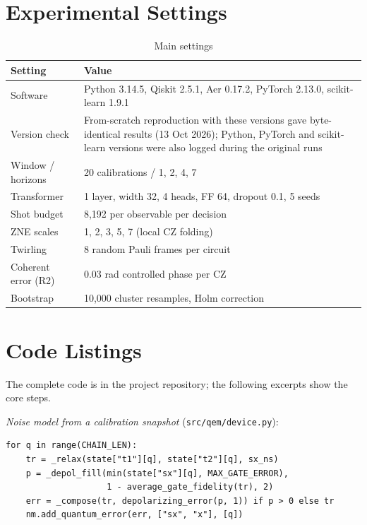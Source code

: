 \documentclass[conference]{IEEEtran}
\begin{document}
\section{Experimental Settings}
\begin{table}[htbp]
\caption{Main settings}
\begin{center}
\begin{tabular}{p{2.3cm}p{5.6cm}}
\toprule
\textbf{Setting} & \textbf{Value} \\
\midrule
Software & Python 3.14.5, Qiskit 2.5.1, Aer 0.17.2, PyTorch 2.13.0, scikit-learn 1.9.1 \\
Version check & From-scratch reproduction with these versions gave byte-identical results (13 Oct 2026); Python, PyTorch and scikit-learn versions were also logged during the original runs \\
Window / horizons & 20 calibrations / 1, 2, 4, 7 \\
Transformer & 1 layer, width 32, 4 heads, FF 64, dropout 0.1, 5 seeds \\
Shot budget & 8,192 per observable per decision \\
ZNE scales & 1, 2, 3, 5, 7 (local CZ folding) \\
Twirling & 8 random Pauli frames per circuit \\
Coherent error (R2) & 0.03 rad controlled phase per CZ \\
Bootstrap & 10,000 cluster resamples, Holm correction \\
\bottomrule
\end{tabular}
\end{center}
\end{table}

\section{Code Listings}
The complete code is in the project repository; the following excerpts show the core steps.

\textit{Noise model from a calibration snapshot} (\texttt{src/qem/device.py}):
\begin{lstlisting}
for q in range(CHAIN_LEN):
    tr = _relax(state["t1"][q], state["t2"][q], sx_ns)
    p = _depol_fill(min(state["sx"][q], MAX_GATE_ERROR),
                    1 - average_gate_fidelity(tr), 2)
    err = _compose(tr, depolarizing_error(p, 1)) if p > 0 else tr
    nm.add_quantum_error(err, ["sx", "x"], [q])
\end{lstlisting}
\end{document}
